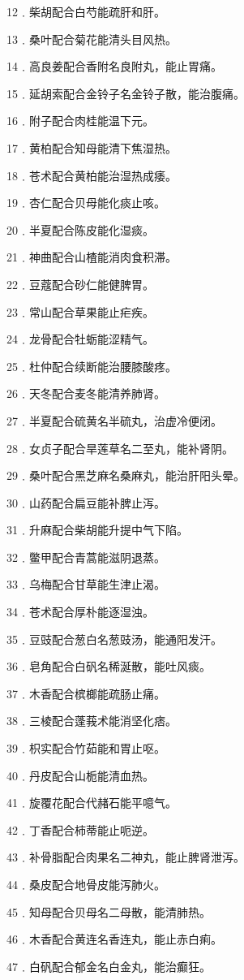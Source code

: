 \documentclass[12pt,UTF8]{ctexbook}
\begin{document}
12﹒柴胡配合白芍能疏肝和肝。

13﹒桑叶配合菊花能清头目风热。

14﹒高良姜配合香附名良附丸，能止胃痛。

15﹒延胡索配合金铃子名金铃子散，能治腹痛。

16﹒附子配合肉桂能温下元。

17﹒黄柏配合知母能清下焦湿热。

18﹒苍术配合黄柏能治湿热成痿。

19﹒杏仁配合贝母能化痰止咳。

20﹒半夏配合陈皮能化湿痰。

21﹒神曲配合山楂能消肉食积滞。

22﹒豆蔻配合砂仁能健脾胃。

23﹒常山配合草果能止疟疾。

24﹒龙骨配合牡蛎能涩精气。

25﹒杜仲配合续断能治腰膝酸疼。

26﹒天冬配合麦冬能清养肺肾。

27﹒半夏配合硫黄名半硫丸，治虚冷便闭。

28﹒女贞子配合旱莲草名二至丸，能补肾阴。

29﹒桑叶配合黑芝麻名桑麻丸，能治肝阳头晕。

30﹒山药配合扁豆能补脾止泻。

31﹒升麻配合柴胡能升提中气下陷。

32﹒鳖甲配合青蒿能滋阴退蒸。

33﹒乌梅配合甘草能生津止渴。

34﹒苍术配合厚朴能逐湿浊。

35﹒豆豉配合葱白名葱豉汤，能通阳发汗。

36﹒皂角配合白矾名稀涎散，能吐风痰。

37﹒木香配合槟榔能疏肠止痛。

38﹒三棱配合蓬莪术能消坚化痞。

39﹒枳实配合竹茹能和胃止呕。

40﹒丹皮配合山栀能清血热。

41﹒旋覆花配合代赭石能平噫气。

42﹒丁香配合柿蒂能止呃逆。

43﹒补骨脂配合肉果名二神丸，能止脾肾泄泻。

44﹒桑皮配合地骨皮能泻肺火。

45﹒知母配合贝母名二母散，能清肺热。

46﹒木香配合黄连名香连丸，能止赤白痢。

47﹒白矾配合郁金名白金丸，能治癫狂。
\end{document}
